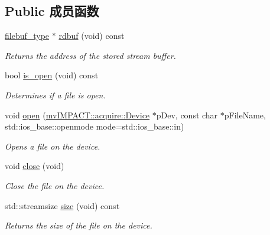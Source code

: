 \subsection*{Public 成员函数}
\begin{DoxyCompactItemize}
\item 
\hyperlink{classmv_i_m_p_a_c_t_1_1acquire_1_1_gen_i_cam_1_1_i_dev_file_stream_buf}{filebuf\+\_\+type} $\ast$ \hyperlink{classmv_i_m_p_a_c_t_1_1acquire_1_1_gen_i_cam_1_1_i_dev_file_stream_base_af0eeb589e3eb0e62c6bb25d372c0df35}{rdbuf} (void) const 
\begin{DoxyCompactList}\small\item\em Returns the address of the stored stream buffer. \end{DoxyCompactList}\item 
bool \hyperlink{classmv_i_m_p_a_c_t_1_1acquire_1_1_gen_i_cam_1_1_i_dev_file_stream_base_a46f61f8585c3da76cb235213ab8f4672}{is\+\_\+open} (void) const 
\begin{DoxyCompactList}\small\item\em Determines if a file is open. \end{DoxyCompactList}\item 
void \hyperlink{classmv_i_m_p_a_c_t_1_1acquire_1_1_gen_i_cam_1_1_i_dev_file_stream_base_a76b6d17adb3ec0657f14deb374c5ff0b}{open} (\hyperlink{classmv_i_m_p_a_c_t_1_1acquire_1_1_device}{mv\+I\+M\+P\+A\+C\+T\+::acquire\+::\+Device} $\ast$p\+Dev, const char $\ast$p\+File\+Name, std\+::ios\+\_\+base\+::openmode mode=std\+::ios\+\_\+base\+::in)
\begin{DoxyCompactList}\small\item\em Opens a file on the device. \end{DoxyCompactList}\item 
\hypertarget{classmv_i_m_p_a_c_t_1_1acquire_1_1_gen_i_cam_1_1_i_dev_file_stream_base_a9a2c2982dc80de791f717eb33c400b56}{void \hyperlink{classmv_i_m_p_a_c_t_1_1acquire_1_1_gen_i_cam_1_1_i_dev_file_stream_base_a9a2c2982dc80de791f717eb33c400b56}{close} (void)}\label{classmv_i_m_p_a_c_t_1_1acquire_1_1_gen_i_cam_1_1_i_dev_file_stream_base_a9a2c2982dc80de791f717eb33c400b56}

\begin{DoxyCompactList}\small\item\em Close the file on the device. \end{DoxyCompactList}\item 
\hypertarget{classmv_i_m_p_a_c_t_1_1acquire_1_1_gen_i_cam_1_1_i_dev_file_stream_base_a9a2968a48ee9754c0b8731298385beaa}{std\+::streamsize \hyperlink{classmv_i_m_p_a_c_t_1_1acquire_1_1_gen_i_cam_1_1_i_dev_file_stream_base_a9a2968a48ee9754c0b8731298385beaa}{size} (void) const }\label{classmv_i_m_p_a_c_t_1_1acquire_1_1_gen_i_cam_1_1_i_dev_file_stream_base_a9a2968a48ee9754c0b8731298385beaa}

\begin{DoxyCompactList}\small\item\em Returns the size of the file on the device. \end{DoxyCompactList}\end{DoxyCompactItemize}


